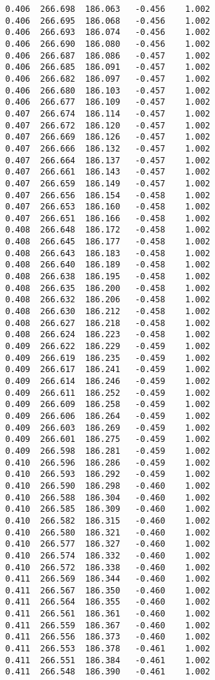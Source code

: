 \begin{verbatim}
   0.406  266.698  186.063   -0.456    1.002
   0.406  266.695  186.068   -0.456    1.002
   0.406  266.693  186.074   -0.456    1.002
   0.406  266.690  186.080   -0.456    1.002
   0.406  266.687  186.086   -0.457    1.002
   0.406  266.685  186.091   -0.457    1.002
   0.406  266.682  186.097   -0.457    1.002
   0.406  266.680  186.103   -0.457    1.002
   0.406  266.677  186.109   -0.457    1.002
   0.407  266.674  186.114   -0.457    1.002
   0.407  266.672  186.120   -0.457    1.002
   0.407  266.669  186.126   -0.457    1.002
   0.407  266.666  186.132   -0.457    1.002
   0.407  266.664  186.137   -0.457    1.002
   0.407  266.661  186.143   -0.457    1.002
   0.407  266.659  186.149   -0.457    1.002
   0.407  266.656  186.154   -0.458    1.002
   0.407  266.653  186.160   -0.458    1.002
   0.407  266.651  186.166   -0.458    1.002
   0.408  266.648  186.172   -0.458    1.002
   0.408  266.645  186.177   -0.458    1.002
   0.408  266.643  186.183   -0.458    1.002
   0.408  266.640  186.189   -0.458    1.002
   0.408  266.638  186.195   -0.458    1.002
   0.408  266.635  186.200   -0.458    1.002
   0.408  266.632  186.206   -0.458    1.002
   0.408  266.630  186.212   -0.458    1.002
   0.408  266.627  186.218   -0.458    1.002
   0.408  266.624  186.223   -0.458    1.002
   0.409  266.622  186.229   -0.459    1.002
   0.409  266.619  186.235   -0.459    1.002
   0.409  266.617  186.241   -0.459    1.002
   0.409  266.614  186.246   -0.459    1.002
   0.409  266.611  186.252   -0.459    1.002
   0.409  266.609  186.258   -0.459    1.002
   0.409  266.606  186.264   -0.459    1.002
   0.409  266.603  186.269   -0.459    1.002
   0.409  266.601  186.275   -0.459    1.002
   0.409  266.598  186.281   -0.459    1.002
   0.410  266.596  186.286   -0.459    1.002
   0.410  266.593  186.292   -0.459    1.002
   0.410  266.590  186.298   -0.460    1.002
   0.410  266.588  186.304   -0.460    1.002
   0.410  266.585  186.309   -0.460    1.002
   0.410  266.582  186.315   -0.460    1.002
   0.410  266.580  186.321   -0.460    1.002
   0.410  266.577  186.327   -0.460    1.002
   0.410  266.574  186.332   -0.460    1.002
   0.410  266.572  186.338   -0.460    1.002
   0.411  266.569  186.344   -0.460    1.002
   0.411  266.567  186.350   -0.460    1.002
   0.411  266.564  186.355   -0.460    1.002
   0.411  266.561  186.361   -0.460    1.002
   0.411  266.559  186.367   -0.460    1.002
   0.411  266.556  186.373   -0.460    1.002
   0.411  266.553  186.378   -0.461    1.002
   0.411  266.551  186.384   -0.461    1.002
   0.411  266.548  186.390   -0.461    1.002

\end{verbatim}
